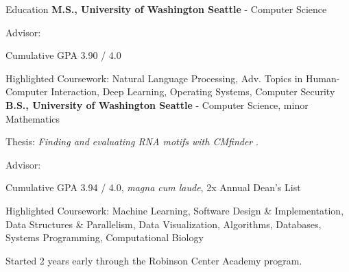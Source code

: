 \begin{rubric}{Education}
	\textbf{M.S., University of Washington Seattle} - Computer Science
    \par Advisor: \pWeldD{}
    \par Cumulative GPA 3.90 / 4.0
    \par Highlighted Coursework: Natural Language Processing, Adv. Topics in Human-Computer Interaction, Deep Learning, Operating Systems, Computer Security
\entry*[2016 -- 2019] %
	\textbf{B.S., University of Washington Seattle} - Computer Science, minor Mathematics
	\par Thesis: \emph{Finding and evaluating RNA motifs with CMfinder} \cite{zhou2019thesis}.
	\par Advisor: \pRuzzoL{}
	\par Cumulative GPA 3.94 / 4.0, \textit{magna cum laude}, 2x Annual Dean's List
	\par Highlighted Coursework: Machine Learning, Software Design \& Implementation, Data Structures \& Parallelism, Data Visualization, Algorithms, Databases, Systems Programming, Computational Biology
	\par Started 2 years early through the Robinson Center Academy program.
\end{rubric}